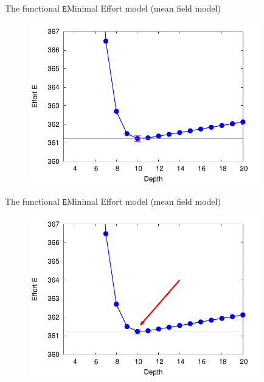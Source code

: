 \documentclass[11pt,svgnames]{beamer}
\newcommand{\Ee}{\mathtt E}
\begin{document}
\begin{frame}{The functional $\boldsymbol{\Ee}$}{Minimal Effort model (mean field model)}
\begin{figure}[ht]%
\includegraphics[width=10cm,draft=false]{immagini/effVSdepth_1000_1.pdf}
\end{figure}
\end{frame}

\begin{frame}[noframenumbering]{The functional $\boldsymbol{\Ee}$}{Minimal Effort model (mean field model)}
\begin{figure}[ht]%
\includegraphics[width=10cm,draft=false]{immagini/Eff2.pdf}
\end{figure}
\end{frame}
\end{document}
